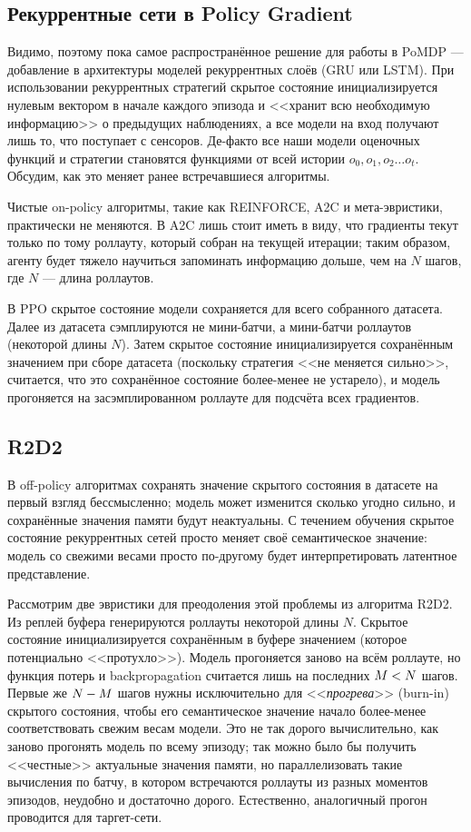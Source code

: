 \subsection{Рекуррентные сети в Policy Gradient}

Видимо, поэтому пока самое распространённое решение для работы в PoMDP --- добавление в архитектуры моделей рекуррентных слоёв (GRU или LSTM). При использовании рекуррентных стратегий скрытое состояние инициализируется нулевым вектором в начале каждого эпизода и <<хранит всю необходимую информацию>> о предыдущих наблюдениях, а все модели на вход получают лишь то, что поступает с сенсоров. Де-факто все наши модели оценочных функций и стратегии становятся функциями от всей истории $o_0, o_1, o_2 \dots o_t$. Обсудим, как это меняет ранее встречавшиеся алгоритмы.

Чистые on-policy алгоритмы, такие как REINFORCE, A2C и мета-эвристики, практически не меняются. В A2C лишь стоит иметь в виду, что градиенты текут только по тому роллауту, который собран на текущей итерации; таким образом, агенту будет тяжело научиться запоминать информацию дольше, чем на $N$ шагов, где $N$ --- длина роллаутов.

В PPO скрытое состояние модели сохраняется для всего собранного датасета. Далее из датасета сэмплируются не мини-батчи, а мини-батчи роллаутов (некоторой длины $N$). Затем скрытое состояние инициализируется сохранённым значением при сборе датасета (поскольку стратегия <<не меняется сильно>>, считается, что это сохранённое состояние более-менее не устарело), и модель прогоняется на засэмплированном роллауте для подсчёта всех градиентов.

\subsection{R2D2}

В off-policy алгоритмах сохранять значение скрытого состояния в датасете на первый взгляд бессмысленно; модель может изменится сколько угодно сильно, и сохранённые значения памяти будут неактуальны. С течением обучения скрытое состояние рекуррентных сетей просто меняет своё семантическое значение: модель со свежими весами просто по-другому будет интерпретировать латентное представление.

Рассмотрим две эвристики для преодоления этой проблемы из алгоритма R2D2. Из реплей буфера генерируются роллауты некоторой длины $N$. Скрытое состояние инициализируется сохранённым в буфере значением (которое потенциально <<протухло>>). Модель прогоняется заново на всём роллауте, но функция потерь и backpropagation считается лишь на последних $M \HM< N$ шагов. Первые же $N \HM- M$ шагов нужны исключительно для <<\emph{прогрева}>> (burn-in) скрытого состояния, чтобы его семантическое значение начало более-менее соответствовать свежим весам модели. Это не так дорого вычислительно, как заново прогонять модель по всему эпизоду; так можно было бы получить <<честные>> актуальные значения памяти, но параллелизовать такие вычисления по батчу, в котором встречаются роллауты из разных моментов эпизодов, неудобно и достаточно дорого. Естественно, аналогичный прогон проводится для таргет-сети.

